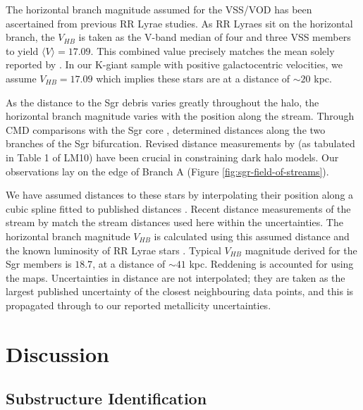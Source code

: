 \documentclass[preprint2]{aastex}
\begin{document}
The horizontal branch magnitude assumed for the VSS/VOD has been ascertained from previous RR Lyrae studies. As RR Lyraes sit on the horizontal branch, the $V_{HB}$ is taken as the V-band median of four \citet{Prior;et-al_2009a} and three  \citet{Duffau;et-al_2006} VSS members to yield $\langle{}V\rangle{} = 17.09$. This combined value precisely matches the mean solely reported by \citet{Duffau;et-al_2006}. In our K-giant sample with positive galactocentric velocities, we assume $V_{HB} = 17.09$ which implies these stars are at a distance of $\sim20$ kpc.

As the distance to the Sgr debris varies greatly throughout the halo, the horizontal branch magnitude varies with the position along the stream. 
Through CMD comparisons with the Sgr core \citep{Bellazzini;et-al_2006}, \citet{Belokurov;et-al_2006} determined distances along the two branches of the Sgr bifurcation.  Revised distance measurements by \citet{Siegel;et-al_2007} (as tabulated in Table 1 of LM10) have been crucial in constraining dark halo models. Our observations lay on the edge of Branch A (Figure \ref{fig:sgr-field-of-streams}).

We have assumed distances to these stars by interpolating their position along a cubic spline fitted to published distances \citep{Siegel;et-al_2007}. Recent distance measurements of the stream by \citet{Ruhland;et-al_2011} match the stream distances used here within the uncertainties. The horizontal branch magnitude $V_{HB}$ is calculated using this assumed distance and the known luminosity of RR Lyrae stars \citep[$M_V = +0.69;$][]{Tsujimoto;et-al_1998}. Typical $V_{HB}$ magnitude derived for the Sgr members is $18.7$, at a distance of $\sim{}41$ kpc. Reddening is accounted for using the \citet{Schlegel;Finkbeiner;Davis_1998} maps. Uncertainties in distance are not interpolated; they are taken as the largest published uncertainty of the closest neighbouring data points, and this is propagated through to our reported metallicity uncertainties. 

\section{Discussion}
\label{sec:discussion}
		
	\subsection{Substructure Identification}
	\label{sec:substructure-identification}
		
\end{document}
